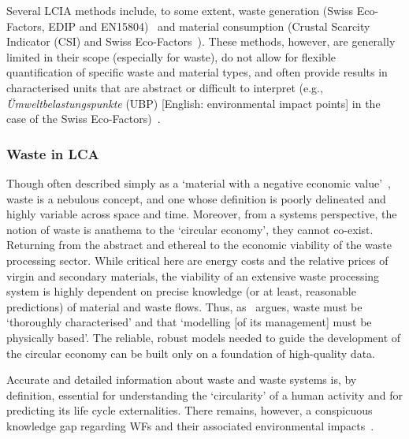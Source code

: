 Several LCIA methods include, to some extent, waste generation (Swiss Eco-Factors, EDIP and EN15804)~\citep{foen2021ecofactors,hauschild2003edip,cen2019en15804} and material consumption (Crustal Scarcity Indicator (CSI) and Swiss Eco-Factors~\citep{arvidsson2020csi,foen2021ecofactors}). These methods, however, are generally limited in their scope (especially for waste), do not allow for flexible quantification of specific waste and material types, and often provide results in characterised units that are abstract or difficult to interpret (e.g., \textit{Ümweltbelastungspunkte} (UBP) [English: environmental impact points] in the case of the Swiss Eco-Factors)~\citep{su2020sustainableproddev}.


\subsubsection{Waste in LCA}\label{sec:intro-waste}

Though often described simply as a `material with a negative economic value'~\citep{guinee2004economicallocation}, waste is a nebulous concept, and one whose definition is poorly delineated and highly variable across space and time.  Moreover, from a systems perspective, the notion of waste is anathema to the `circular economy', they cannot co-exist. Returning from the abstract and ethereal to the economic viability of the waste processing sector. While critical here are energy costs and the relative prices of virgin and secondary materials, the viability of an extensive waste processing system is highly dependent on precise knowledge (or at least, reasonable predictions) of material and waste flows. Thus, as~\cite{bisinella2024wastelca} argues, waste must be `thoroughly characterised' and that `modelling [of its management] must be physically based'. The reliable, robust models needed to guide the development of the circular economy can be built only on a foundation of high-quality data.

Accurate and detailed information about waste and waste systems is, by definition, essential for understanding the `circularity' of a human activity and for predicting its life cycle externalities. There remains, however, a conspicuous knowledge gap regarding WFs and their associated environmental impacts~\citep{laurenti2023wastefootprint}.


